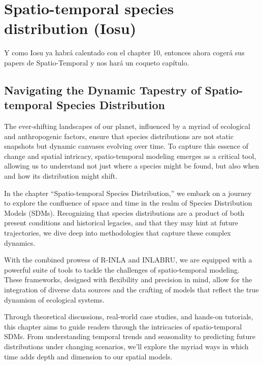 \documentclass[
]{krantz}
\begin{document}
\pagebreak
\setcounter{chapter}{11}
\setcounter{section}{0}
\renewcommand{\thepage}{\arabic{page}}

\hypertarget{spatio-temporal-species-distribution-iosu}{%
\chapter{Spatio-temporal species distribution (Iosu)}\label{spatio-temporal-species-distribution-iosu}}

Y como Iosu ya habrá calentado con el chapter 10, entonces ahora cogerá sus papers de Spatio-Temporal y nos hará un coqueto capítulo.

\hypertarget{navigating-the-dynamic-tapestry-of-spatio-temporal-species-distribution}{%
\section{Navigating the Dynamic Tapestry of Spatio-temporal Species Distribution}\label{navigating-the-dynamic-tapestry-of-spatio-temporal-species-distribution}}

The ever-shifting landscapes of our planet, influenced by a myriad of ecological and anthropogenic factors, ensure that species distributions are not static snapshots but dynamic canvases evolving over time. To capture this essence of change and spatial intricacy, spatio-temporal modeling emerges as a critical tool, allowing us to understand not just where a species might be found, but also when and how its distribution might shift.

In the chapter ``Spatio-temporal Species Distribution,'' we embark on a journey to explore the confluence of space and time in the realm of Species Distribution Models (SDMs). Recognizing that species distributions are a product of both present conditions and historical legacies, and that they may hint at future trajectories, we dive deep into methodologies that capture these complex dynamics.

With the combined prowess of R-INLA and INLABRU, we are equipped with a powerful suite of tools to tackle the challenges of spatio-temporal modeling. These frameworks, designed with flexibility and precision in mind, allow for the integration of diverse data sources and the crafting of models that reflect the true dynamism of ecological systems.

Through theoretical discussions, real-world case studies, and hands-on tutorials, this chapter aims to guide readers through the intricacies of spatio-temporal SDMs. From understanding temporal trends and seasonality to predicting future distributions under changing scenarios, we'll explore the myriad ways in which time adds depth and dimension to our spatial models.
\end{document}
